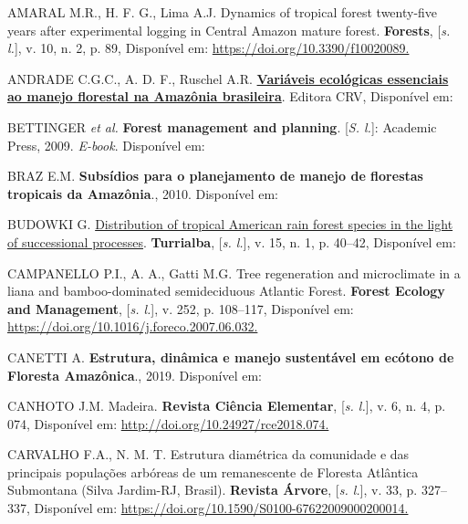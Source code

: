 \documentclass[
]{article}
\newlength{\cslhangindent}
\newlength{\cslentryspacingunit} %
\newenvironment{CSLReferences}[2] %
 {%
  \setlength{\parindent}{0pt}
  \ifodd #1
  \let\oldpar\par
  \def\par{\hangindent=\cslhangindent\oldpar}
  \fi
  \setlength{\parskip}{#2\cslentryspacingunit}
 }%
 {}
\begin{document}
\hypertarget{refs}{}
\begin{CSLReferences}{0}{1}
\leavevmode{}%
AMARAL M.R., H. F. G., Lima A.J. Dynamics of tropical forest twenty-five
years after experimental logging in Central Amazon mature forest.
\textbf{Forests}, {[}\emph{s. l.}{]}, v. 10, n. 2, p. 89, Disponível em:
\href{https://doi.org/10.3390/f10020089}{https://doi.org/10.3390/f10020089.
}

\leavevmode{}%
ANDRADE C.G.C., A. D. F., Ruschel A.R. \textbf{\href{}{Variáveis
ecológicas essenciais ao manejo florestal na Amazônia brasileira}}.
Editora CRV, Disponível em:

\leavevmode{}%
BETTINGER \emph{et al.} \textbf{Forest management and planning}.
{[}\emph{S. l.}{]}: {Academic Press}, 2009. \emph{E-book}. Disponível
em:

\leavevmode{}%
BRAZ E.M. \textbf{Subsídios para o planejamento de manejo de florestas
tropicais da Amazônia}., 2010. Disponível em:

\leavevmode{}%
BUDOWKI G. \href{}{Distribution of tropical American rain forest species
in the light of successional processes}. \textbf{Turrialba}, {[}\emph{s.
l.}{]}, v. 15, n. 1, p. 40--42, Disponível em:

\leavevmode{}%
CAMPANELLO P.I., A. A., Gatti M.G. Tree regeneration and microclimate in
a liana and bamboo-dominated semideciduous Atlantic Forest.
\textbf{Forest Ecology and Management}, {[}\emph{s. l.}{]}, v. 252, p.
108--117, Disponível em:
\href{https://doi.org/10.1016/j.foreco.2007.06.032}{https://doi.org/10.1016/j.foreco.2007.06.032.
}

\leavevmode{}%
CANETTI A. \textbf{Estrutura, dinâmica e manejo sustentável em ecótono
de Floresta Amazônica}., 2019. Disponível em:

\leavevmode{}%
CANHOTO J.M. Madeira. \textbf{Revista Ciência Elementar}, {[}\emph{s.
l.}{]}, v. 6, n. 4, p. 074, Disponível em:
\href{http://doi.org/10.24927/rce2018.074}{http://doi.org/10.24927/rce2018.074.
}

\leavevmode{}%
CARVALHO F.A., N. M. T. Estrutura diamétrica da comunidade e das
principais populações arbóreas de um remanescente de Floresta Atlântica
Submontana (Silva Jardim-RJ, Brasil). \textbf{Revista Árvore},
{[}\emph{s. l.}{]}, v. 33, p. 327--337, Disponível em:
\href{https://doi.org/10.1590/S0100-67622009000200014}{https://doi.org/10.1590/S0100-67622009000200014.
}


\end{CSLReferences}
\end{document}
